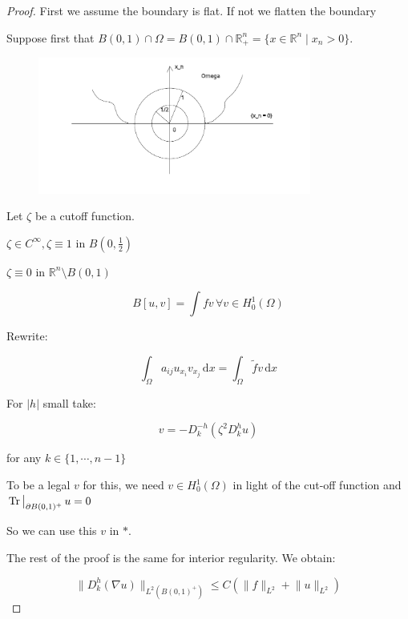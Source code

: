 \documentclass{article}
\theoremstyle{definition}
\begin{document}
\begin{proof}

    First we assume the boundary is flat. If not we flatten the boundary

    Suppose first that \(B(0,1) \cap \Omega = B(0,1) \cap \mathbb{R}^n_+ = \{ x\in \mathbb{R}^n \mid x_n > 0 \}\). 


    \begin{figure}[H]
        \centering
        \includegraphics[width=0.8\textwidth]{img/flattening}
        \caption{}
        \label{fig:flat}
    \end{figure}

    Let \(\zeta\) be a cutoff function.

    \(\zeta \in C^{\infty}, \zeta \equiv 1\) in \(B(0,\frac{1}{2})\)

    \(\zeta \equiv 0\) in \(\mathbb{R}^n \setminus B(0,1)\)

    \[
        B[u,v] = \int fv \, \forall v \in H^1_0(\Omega)
    \]

    Rewrite:

    \[
        \int_{\Omega} a_{ij} u_{x_i} v_{x_j} \,\mathrm{d}x = \int_{\Omega} \widetilde{f} v \,\mathrm{d}x 
    \]

    For \(\vert h \vert \) small take:

    \[
        v = - D_k^{-h} (\zeta^2 D_k^h u)
    \]

    for any \(k\in \{ 1, \cdots , n-1 \} \) 

    To be a legal \(v\) for this, we need \(v\in H^1_0(\Omega)\) in light of the cut-off function and \(\eval{\Tr}_{\partial B(0,1)^+} u = 0 \) 

    So we can use this \(v\) in \(\ast\).

    The rest of the proof is the same for interior regularity. We obtain:

    \[
        \lVert D_k^h (\nabla u) \rVert _{L^2(B(0,1)^+)} \leq C \left( \lVert f \rVert _{L^2} + \lVert u \rVert _{L^2} \right) 
    \]


\end{proof}
\end{document}
